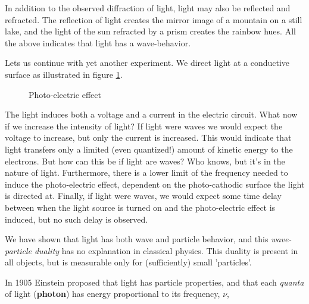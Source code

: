In addition to the observed diffraction of light,
light may also be reflected and refracted. The reflection of light creates
the mirror image of a mountain on a still lake, and the light of
the sun refracted by a prism creates the rainbow hues. All the above
indicates that light has a wave-behavior. 
\newline
%
\newline

Lets us continue with yet another experiment. We direct light at a
conductive surface as illustrated in figure
\ref{photoElectricEffect}. 

\begin{figure}[hbtp]
\begin{center}
  \caption{
    Photo-electric effect
  }
  \label{photoElectricEffect}
\end{center}
\end{figure}


The light induces both a voltage and a current in the electric
circuit. What now if we increase the intensity of light? If light
were waves we would expect the voltage to increase, but only the
current is increased. This would indicate that light transfers only a
limited (even quantized!) amount of kinetic energy to the
electrons. But how can this be if light are waves? Who knows, but it's
in the nature of light. Furthermore, there is a lower limit of the
frequency needed to induce the photo-electric effect, dependent on the
photo-cathodic surface the light is directed at. Finally, if light
were waves, we would expect some time delay between when the light
source is turned on and the photo-electric effect is induced, but no
such delay is observed.

We have shown that light has both wave and particle
behavior, and this \emph{wave-particle duality} has no explanation in
classical physics. This duality is present in all objects, but is
measurable only for (sufficiently) small 'particles'.
\newline
%
\newline

In 1905 Einstein proposed that light has particle properties, 
and that each \emph{quanta} of light ({\bf photon}) has energy
  proportional to its frequency, $\nu$, 

